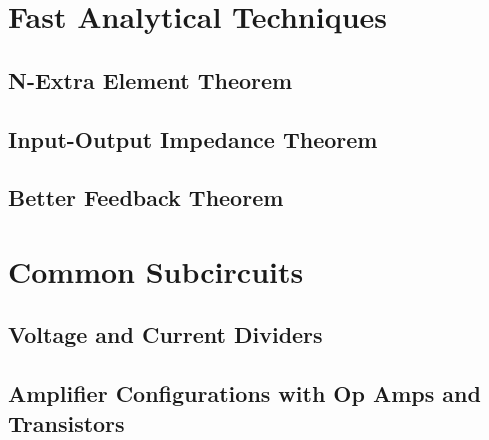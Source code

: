 \section{Fast Analytical Techniques}
\subsection{N-Extra Element Theorem}
\subsection{Input-Output Impedance Theorem}
\subsection{Better Feedback Theorem}
\section{Common Subcircuits}
\subsection{Voltage and Current Dividers}





\subsection{Amplifier Configurations with Op Amps and Transistors}
